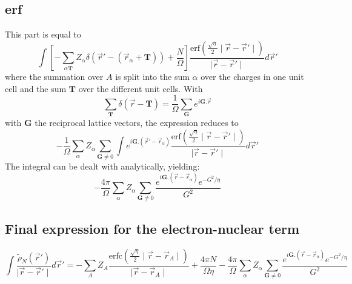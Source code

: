 \documentclass[11pt,a4paper]{article}
\begin{document}
\subsection{erf}
This part is equal to
\begin{equation}
\int \left[ - \sum\limits_{\alpha \mathbf{T}} Z_{\alpha} \delta(\vec{r}' - (\vec{r}_{\alpha} + \mathbf{T})) + \frac{N}{\Omega} \right]  \frac{\text{erf}\left( \frac{\sqrt{\eta}}{2} \mid \vec{r} - \vec{r}' \mid \right)}{\mid \vec{r} - \vec{r}' \mid} d\vec{r}'
\end{equation}
where the summation over $A$ is split into the sum $\alpha$ over the charges in one unit cell and the sum $\mathbf{T}$ over the different unit cells. With
\begin{equation}
\sum\limits_{\mathbf{T}} \delta(\vec{r} - \mathbf{T}) = \frac{1}{\Omega} \sum\limits_{\mathbf{G}} e^{i \mathbf{G} . \vec{r}}
\end{equation}
with $\mathbf{G}$ the reciprocal lattice vectors, the expression reduces to
\begin{equation}
-\frac{1}{\Omega} \sum\limits_{\alpha} Z_{\alpha} \sum\limits_{\mathbf{G} \neq 0} \int e^{i \mathbf{G}.(\vec{r}' - \vec{r}_{\alpha})} \frac{\text{erf}\left( \frac{\sqrt{\eta}}{2} \mid \vec{r} - \vec{r}' \mid \right)}{\mid \vec{r} - \vec{r}' \mid} d\vec{r}'
\end{equation}
The integral can be dealt with analytically, yielding:
\begin{equation}
- \frac{4 \pi}{\Omega} \sum\limits_{\alpha} Z_{\alpha} \sum\limits_{\mathbf{G} \neq 0} \frac{e^{i \mathbf{G}.(\vec{r} - \vec{r}_{\alpha})} e^{-G^2/\eta}}{G^2}
\end{equation}
\subsection{Final expression for the electron-nuclear term}
\begin{equation}
\int \frac{\tilde{\rho}_N(\vec{r}')}{\mid \vec{r} - \vec{r}' \mid} d\vec{r}' = - \sum\limits_A Z_A \frac{\text{erfc}\left( \frac{\sqrt{\eta}}{2} \mid \vec{r} - \vec{r}_A \mid \right)}{\mid \vec{r} - \vec{r}_A \mid} + \frac{4 \pi N}{\Omega \eta} - \frac{4 \pi}{\Omega} \sum\limits_{\alpha} Z_{\alpha} \sum\limits_{\mathbf{G} \neq 0} \frac{e^{i \mathbf{G}.(\vec{r} - \vec{r}_{\alpha})} e^{-G^2/\eta}}{G^2} \label{gjgj2}
\end{equation}
\end{document}

